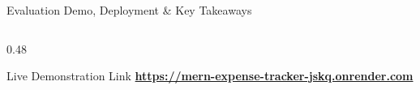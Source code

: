 \documentclass[aspectratio=169, 10pt]{beamer}
\begin{document}
\begin{frame}{Evaluation Demo, Deployment \& Key Takeaways}
\begin{columns}[T]
\begin{column}{0.48\textwidth}
      \begin{alertblock}{\centering Live Demonstration Link}
        \centering\scriptsize
        \href{https://mern-expense-tracker-jskq.onrender.com}{\textcolor{AccentEmerald}{\textbf{https://mern-expense-tracker-jskq.onrender.com}}}
      \end{alertblock}
    \end{column}
  \end{columns}
\end{frame}
\end{document}
